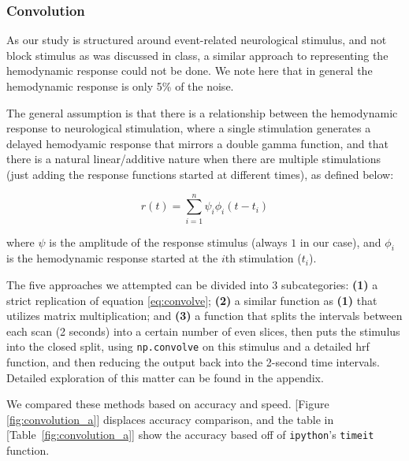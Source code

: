 \subsubsection{Convolution}
\par \indent As our study is structured around event-related neurological 
stimulus, and not block stimulus as was discussed in class, a similar 
approach to representing the hemodynamic response could not be done. 
We note here that in general the hemodynamic response is only 5\% of 
the noise.

The general assumption is that there is a relationship between the 
hemodynamic response to neurological stimulation, where a single 
stimulation generates a delayed hemodyamic response that mirrors 
a double gamma function, and that there is a natural linear/additive 
nature when there are multiple stimulations (just adding the response 
functions started at different times), as defined below:

\begin{equation} \label{eq:convolve}
r(t)= \sum_{i=1}^n \psi_{i} \phi_{i}(t-t_i)
\end{equation}

\noindent where $\psi$ is the amplitude of the response stimulus (always $1$ 
in our case), and $\phi_{i}$ is the hemodynamic response started at the $i$th 
stimulation ($t_i$).

The five approaches we attempted can be divided into 3 subcategories: 
\textbf{(1)} a strict replication of equation \ref{eq:convolve}; \textbf{(2)} 
a similar function as \textbf{(1)} that utilizes matrix multiplication; and 
\textbf{(3)} a function that splits the intervals between each scan (2 seconds)
into a certain number of even slices, then puts the stimulus into the closed 
split, using \texttt{np.convolve} on this stimulus and a detailed hrf function,
and then reducing the output back into the 2-second time intervals. Detailed 
exploration of this matter can be found in the appendix.

We compared these methods based on accuracy and speed. [Figure 
\ref{fig:convolution_a}] displaces accuracy comparison, and the table in 
[Table~\ref{fig:convolution_a}] show the accuracy based off of 
\texttt{ipython}'s \texttt{timeit} function.



